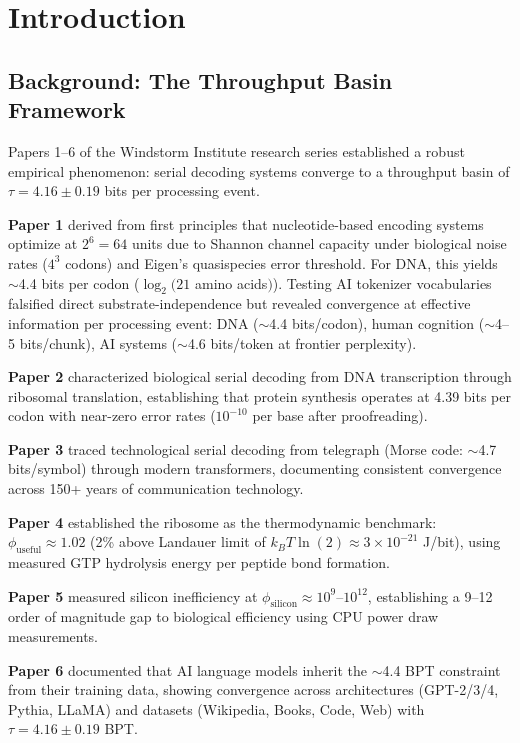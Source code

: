 \documentclass[11pt,a4paper]{article}
\begin{document}
\section{Introduction}

\subsection{Background: The Throughput Basin Framework}

Papers 1--6 of the Windstorm Institute research series established a robust empirical phenomenon: serial decoding systems converge to a throughput basin of $\tau = 4.16 \pm 0.19$ bits per processing event.

\textbf{Paper 1} \cite{whitmer2025a} derived from first principles that nucleotide-based encoding systems optimize at $2^6 = 64$ units due to Shannon channel capacity under biological noise rates ($4^3$ codons) and Eigen's quasispecies error threshold. For DNA, this yields $\sim$4.4 bits per codon ($\log_2(21$ amino acids$)$). Testing AI tokenizer vocabularies falsified direct substrate-independence but revealed convergence at effective information per processing event: DNA ($\sim$4.4 bits/codon), human cognition ($\sim$4--5 bits/chunk), AI systems ($\sim$4.6 bits/token at frontier perplexity).

\textbf{Paper 2} \cite{whitmer2025b} characterized biological serial decoding from DNA transcription through ribosomal translation, establishing that protein synthesis operates at 4.39 bits per codon with near-zero error rates ($10^{-10}$ per base after proofreading).

\textbf{Paper 3} \cite{whitmer2025c} traced technological serial decoding from telegraph (Morse code: $\sim$4.7 bits/symbol) through modern transformers, documenting consistent convergence across 150+ years of communication technology.

\textbf{Paper 4} \cite{whitmer2025d} established the ribosome as the thermodynamic benchmark: $\phi_{\text{useful}} \approx 1.02$ (2\% above Landauer limit of $k_B T \ln(2) \approx 3 \times 10^{-21}$ J/bit), using measured GTP hydrolysis energy per peptide bond formation.

\textbf{Paper 5} \cite{whitmer2025e} measured silicon inefficiency at $\phi_{\text{silicon}} \approx 10^9$--$10^{12}$, establishing a 9--12 order of magnitude gap to biological efficiency using CPU power draw measurements.

\textbf{Paper 6} \cite{whitmer2025f} documented that AI language models inherit the $\sim$4.4 BPT constraint from their training data, showing convergence across architectures (GPT-2/3/4, Pythia, LLaMA) and datasets (Wikipedia, Books, Code, Web) with $\tau = 4.16 \pm 0.19$ BPT.
\end{document}
